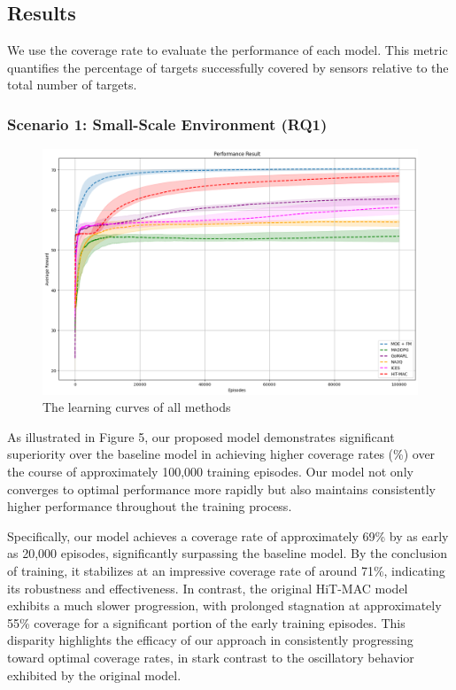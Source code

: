 \documentclass[preprint,12pt]{elsarticle}
\begin{document}
\subsection{Results}

We use the coverage rate to evaluate the performance of each model. This metric quantifies the percentage of targets successfully covered by sensors relative to the total number of targets.
\subsubsection{Scenario 1: Small-Scale Environment (RQ1)}
\begin{figure}[h]
    \centering  \includegraphics[width=\linewidth]{graphics/Results_final.png}
    \caption{The learning curves of all methods}
    \label{fig:result}
    
\end{figure}
As illustrated in Figure 5, our proposed model demonstrates significant superiority over the baseline model in achieving higher coverage rates (\%) over the course of approximately 100,000 training episodes. Our model not only converges to optimal performance more rapidly but also maintains consistently higher performance throughout the training process.

Specifically, our model achieves a coverage rate of approximately 69\% by as early as 20,000 episodes, significantly surpassing the baseline model. By the conclusion of training, it stabilizes at an impressive coverage rate of around 71\%, indicating its robustness and effectiveness. In contrast, the original HiT-MAC model exhibits a much slower progression, with prolonged stagnation at approximately 55\% coverage for a significant portion of the early training episodes. This disparity highlights the efficacy of our approach in consistently progressing toward optimal coverage rates, in stark contrast to the oscillatory behavior exhibited by the original model.
\end{document}
